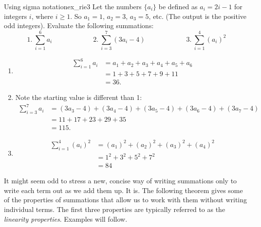 \begin{example}{Using sigma notation}{ex_rie3}{
Let the numbers $\{a_i\}$ be defined as $a_i = 2i-1$ for integers $i$, where $i\geq 1$. So $a_1 = 1$, $a_2 = 3$, $a_3 = 5$, etc. (The output is the positive odd integers). Evaluate the following summations:
$$ 1.\ \sum_{i=1}^6 a_i \qquad\qquad\qquad 2.\ \sum_{i=3}^7 (3a_i-4)\qquad\qquad \qquad 3.\ \sum_{i=1}^4 (a_i)^2$$
}
\end{example}
\begin{solution}
{\begin{enumerate}
		\item		\noindent\vskip-45pt%
						\begin{align*}
						\sum_{i=1}^6 a_i &= a_1+a_2+a_3+a_4+a_5+a_6\\
														&=	1+3+5+7+9+11 \\
														&=	36.
					\end{align*}
		\item	Note the starting value is different than 1:
					\begin{align*}
					\sum_{i=3}^7 a_i &= (3a_3-4)+(3a_4-4)+(3a_5-4)+(3a_6-4)+(3a_7-4) \\
														&= 11+17+23+29+35 \\
														&= 115.
					\end{align*}
		\item		\noindent\vskip-45pt%
						\begin{align*}
						\sum_{i=1}^4 (a_i)^2 &=	(a_1)^2+(a_2)^2+(a_3)^2+(a_4)^2\\
																&=	1^2+3^2+5^2+7^2 \\
																&=	84
						\end{align*}
\end{enumerate}												
}
\end{solution}


It might seem odd to stress a new, concise way of writing summations only to write each term out as we add them up. It is. The following theorem gives some of the properties of summations that allow us to work with them without writing individual terms. The first three properties are typically referred to as the \textit{linearity properties}. Examples will follow.

